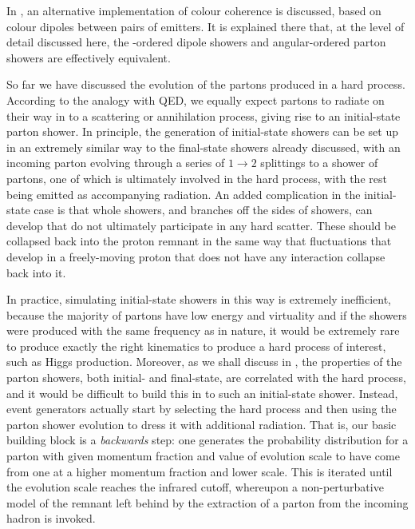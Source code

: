 In , an alternative implementation of colour
coherence is discussed, based on colour dipoles between pairs of
emitters.  It is explained there that, at the level of detail discussed
here, the \kt-ordered dipole showers and angular-ordered parton showers
are effectively equivalent.

So far we have discussed the evolution of the partons produced in a hard
process.  According to the analogy with QED, we equally expect partons
to radiate on their way in to a scattering or annihilation process,
giving rise to an initial-state parton shower.  In principle, the
generation of initial-state showers can be set up in an extremely
similar way to the final-state showers already discussed, with an
incoming parton evolving through a series of $1\to2$ splittings to a
shower of partons, one of which is ultimately involved in the hard
process, with the rest being emitted as accompanying radiation.
An added complication in the initial-state case is that whole showers,
and branches off the sides of showers, can develop that do not
ultimately participate in any hard scatter.  These should be collapsed
back into the proton remnant in the same way that fluctuations that
develop in a freely-moving proton that does not have any interaction
collapse back into it.

In practice, simulating initial-state showers in this way is extremely
inefficient, because the majority
of partons have low energy and virtuality and if the showers were
produced with the same frequency as in nature, it would be extremely
rare to produce exactly the right kinematics to produce a hard process
of interest, such as Higgs production.  Moreover, as we shall discuss in
, the properties of the parton
showers, both initial- and final-state, are correlated with the hard
process, and it would be difficult to build this in to such an
initial-state shower.  Instead,
event generators actually start by selecting the hard process and then
using the parton shower evolution to dress it with additional radiation.
That is, our basic building block is a \emph{backwards\/} step: one
generates the probability distribution for a parton with given momentum
fraction and value of evolution scale to have come from one at a higher
momentum fraction and lower scale.  This is iterated
until the evolution scale reaches the infrared cutoff, whereupon a
non-perturbative model of the remnant left behind by the extraction of a
parton from the incoming hadron is invoked.

